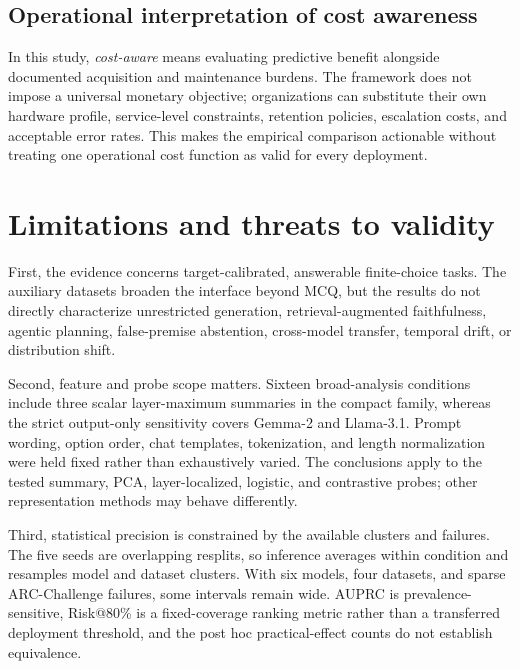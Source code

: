 \documentclass[preprint,12pt,authoryear]{elsarticle}
\begin{document}
\begin{center}
\end{center}

\subsection{Operational interpretation of cost awareness}
In this study, \emph{cost-aware} means evaluating predictive benefit alongside documented acquisition and maintenance burdens. The framework does not impose a universal monetary objective; organizations can substitute their own hardware profile, service-level constraints, retention policies, escalation costs, and acceptable error rates. This makes the empirical comparison actionable without treating one operational cost function as valid for every deployment.

\section{Limitations and threats to validity}
First, the evidence concerns target-calibrated, answerable finite-choice tasks. The auxiliary datasets broaden the interface beyond MCQ, but the results do not directly characterize unrestricted generation, retrieval-augmented faithfulness, agentic planning, false-premise abstention, cross-model transfer, temporal drift, or distribution shift.

Second, feature and probe scope matters. Sixteen broad-analysis conditions include three scalar layer-maximum summaries in the compact family, whereas the strict output-only sensitivity covers Gemma-2 and Llama-3.1. Prompt wording, option order, chat templates, tokenization, and length normalization were held fixed rather than exhaustively varied. The conclusions apply to the tested summary, PCA, layer-localized, logistic, and contrastive probes; other representation methods may behave differently.

Third, statistical precision is constrained by the available clusters and failures. The five seeds are overlapping resplits, so inference averages within condition and resamples model and dataset clusters. With six models, four datasets, and sparse ARC-Challenge failures, some intervals remain wide. AUPRC is prevalence-sensitive, Risk@80\% is a fixed-coverage ranking metric rather than a transferred deployment threshold, and the post hoc practical-effect counts do not establish equivalence.
\end{document}
